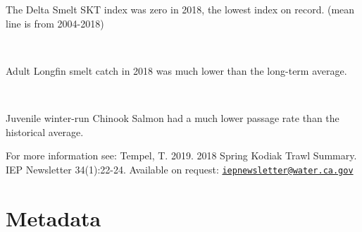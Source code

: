 \documentclass[
]{book}
\begin{document}
\begin{panel-grid}
\begin{columns-nocenter}
\begin{column800}
\begin{expand}
\end{expand}

\end{column800}

\end{columns-nocenter}

\begin{columns-nocenter}

\begin{column800}

The Delta Smelt SKT index was zero in 2018, the lowest index on record. (mean line is from 2004-2018)

\end{column800}

\begin{column40}

~

\end{column40}

\begin{column800}

Adult Longfin smelt catch in 2018 was much lower than the long-term average.

\end{column800}

\begin{column40}

~

\end{column40}

\begin{column800}

Juvenile winter-run Chinook Salmon had a much lower passage rate than the historical average.

\end{column800}

\end{columns-nocenter}

\end{panel-grid}

\begin{disclaimer}
For more information see: Tempel, T. 2019. 2018 Spring Kodiak Trawl
Summary. IEP Newsletter 34(1):22-24. Available on request:
\href{mailto:iepnewsletter@water.ca.gov}{\nolinkurl{iepnewsletter@water.ca.gov}}
\end{disclaimer}

\hypertarget{metadata}{%
\chapter{Metadata}\label{metadata}}
\end{document}
